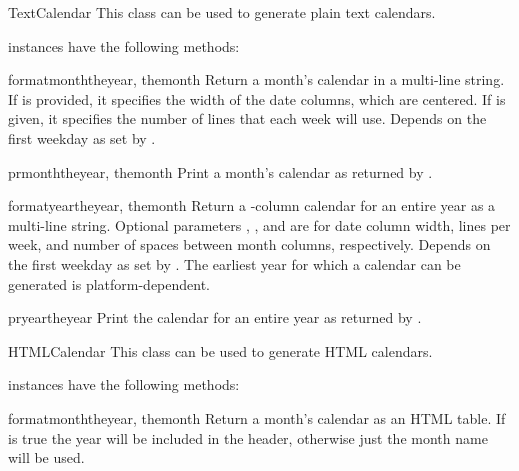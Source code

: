 \begin{classdesc}{TextCalendar}{}
This class can be used to generate plain text calendars.

\end{classdesc}

 instances have the following methods:

\begin{methoddesc}{formatmonth}{theyear, themonth}
Return a month's calendar in a multi-line string. If  is
provided, it specifies the width of the date columns, which are
centered. If  is given, it specifies the number of lines that
each week will use. Depends on the first weekday as set by
.
\end{methoddesc}

\begin{methoddesc}{prmonth}{theyear, themonth}
Print a month's calendar as returned by .
\end{methoddesc}

\begin{methoddesc}{formatyear}{theyear, themonth}
Return a -column calendar for an entire year as a multi-line string.
Optional parameters , , and  are for date column
width, lines per week, and number of spaces between month columns,
respectively. Depends on the first weekday as set by
.  The earliest year for which a calendar can
be generated is platform-dependent.
\end{methoddesc}

\begin{methoddesc}{pryear}{theyear}
Print the calendar for an entire year as returned by .
\end{methoddesc}


\begin{classdesc}{HTMLCalendar}{}
This class can be used to generate HTML calendars.

\end{classdesc}

 instances have the following methods:

\begin{methoddesc}{formatmonth}{theyear, themonth}
Return a month's calendar as an HTML table. If  is
true the year will be included in the header, otherwise just the
month name will be used.
\end{methoddesc}

